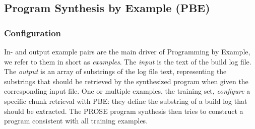 \subsection{Program Synthesis by Example (PBE)}
\label{sec:expl-pbe}

\subsubsection{Configuration}
In- and output example pairs are the main driver of Programming by
Example, we refer to them in short as \emph{examples}.
The
\emph{input} is the text of the build log file.
The \emph{output} is
an array of substrings of the log file text, representing the
substrings that should be retrieved by the synthesized program when
given the corresponding input file.
One or multiple examples, the
training set, \emph{configure} a specific chunk retrieval with PBE:
they define the substring of a build log that should be extracted.
The
PROSE program synthesis then tries to construct a program consistent
with all training examples.



